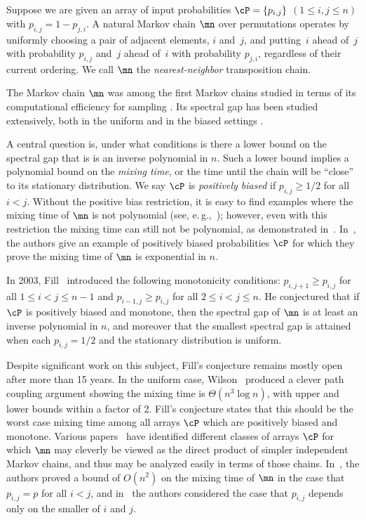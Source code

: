 \documentclass[11pt]{article}
\providecommand{\eg}{e.\,g.}
\begin{document}
Suppose we are given %
%
an array  %
of input probabilities $\cP = \{p_{i,j}\}$ 
%
%
%
$(1 \leq i, j \leq n)$   %
with $p_{i, j} = 1-p_{j, i}$.  A natural 
Markov chain $\mn$ over permutations operates by uniformly choosing a 
pair of adjacent elements, $i$ and~$j$, and putting~$i$ ahead of~$j$ 
with probability $p_{i,j}$ and~$j$ ahead of~$i$ with probability 
$p_{j,i}$, %
%
regardless   %
of their current ordering.  We call $\mn$ the 
\emph{nearest-neighbor} transposition chain.

The Markov chain $\mn$ was among the first Markov chains studied in 
terms of its computational efficiency for sampling \cite{ald, diasha, 
dsc}. Its spectral gap has been studied extensively, both in 
the uniform and
in the  %
biased settings \cite{BBHM05,bmrs,DSC93b, diasha, wilson}. 

%
%
A central question is, %
under what conditions %
is there a lower bound on the spectral gap that is
is an inverse polynomial in $n$.
%
Such a lower bound    %
implies a polynomial
%
bound 
on the \emph{mixing time}, or the time until the chain will be 
``close'' to its stationary distribution. We say $\cP$ is 
\emph{positively biased} if $p_{i,j}\geq 1/2$ for all $i<j$.
Without the %
%
positive bias  %
restriction, it is easy to find examples where the mixing time of $\mn$ is
not polynomial (see, \eg,~\cite{bmrs}); 
however, even with this restriction the mixing time can still not be polynomial, as demonstrated in~\cite{bmrs}.  In~\cite{bmrs}, the authors give an example of positively biased probabilities $\cP$ for which they prove the mixing time of $\mn$ is exponential in $n.$

In 2003, %
Fill~\cite{F03}  %
introduced the following monotonicity 
conditions: $p_{i,j+1}\geq p_{i,j}$ for all $1\leq i<j\leq n-1$ and 
$p_{i-1,j}\geq p_{i,j}$ for all $2\leq i<j\leq n$.  He conjectured that  
if $\cP$ is positively biased and monotone, then the spectral gap of 
$\mn$ is  %
at least  %
an inverse polynomial in $n$, and moreover that the smallest 
spectral gap is attained when each $p_{i,j}=1/2$ and the stationary 
distribution is uniform. 

Despite significant work on this subject, Fill's conjecture remains 
mostly open after more than 15 years. In the uniform case, Wilson~\cite{wilson} produced a 
clever path coupling argument showing the mixing 
time is $\Theta(n^3\log n)$, with upper and lower bounds within a factor of 2. 
Fill's conjecture states that this should be the worst case mixing time among all 
arrays $\cP$ which are positively biased and monotone. 
%
%
%
%
%
Various papers~\cite{BBHM05, bmrs} have identified 
different classes of
arrays   %
$\cP$ for which $\mn$ may cleverly be viewed as 
the direct product of simpler independent Markov chains, and thus may 
be analyzed easily in terms of those chains. In~\cite{BBHM05}, the 
authors proved a bound of $O(n^2)$ on the mixing time of $\mn$ in the 
case that $p_{i,j} = p$ for all $i<j$, and in~\cite{bmrs} the authors 
considered the case that $p_{i,j}$ depends only on the smaller of $i$ 
and $j$.
\end{document}
